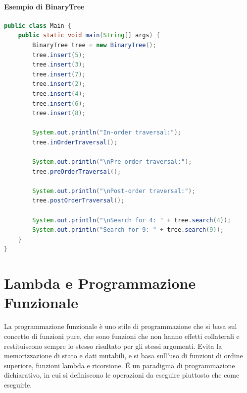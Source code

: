 \documentclass[11pt]{article}
\begin{document}
\paragraph{Esempio di BinaryTree}
\begin{lstlisting}[language=Java]
public class Main {
    public static void main(String[] args) {
        BinaryTree tree = new BinaryTree();
        tree.insert(5);
        tree.insert(3);
        tree.insert(7);
        tree.insert(2);
        tree.insert(4);
        tree.insert(6);
        tree.insert(8);

        System.out.println("In-order traversal:");
        tree.inOrderTraversal();

        System.out.println("\nPre-order traversal:");
        tree.preOrderTraversal();

        System.out.println("\nPost-order traversal:");
        tree.postOrderTraversal();

        System.out.println("\nSearch for 4: " + tree.search(4));
        System.out.println("Search for 9: " + tree.search(9));
    }
}
\end{lstlisting}
\section{Lambda e Programmazione Funzionale}
La programmazione funzionale è uno stile di programmazione che si basa sul concetto di funzioni pure,
che sono funzioni che non hanno effetti collaterali e restituiscono sempre lo stesso risultato per gli stessi argomenti.
Evita la memorizzazione di stato e dati mutabili, e si basa sull'uso di funzioni di ordine superiore, funzioni lambda e ricorsione.
É un paradigma di programmazione dichiarativo, in cui si definiscono le operazioni da eseguire piuttosto che come eseguirle.
\end{document}
